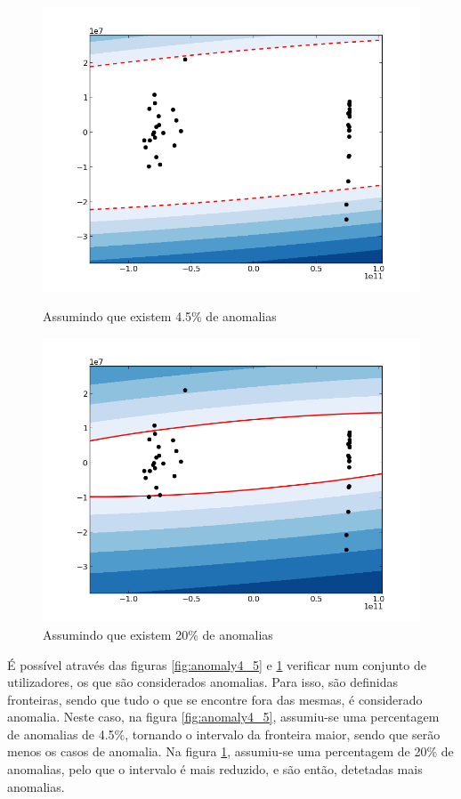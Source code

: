 \documentclass[pdftex,12pt,a4paper]{report}
\begin{document}
\begin{figure}[!htb]
  \centering
  \begin{minipage}[b]{0.4\textwidth}
    \includegraphics[width=\textwidth]{anomaly/ex17_4_5.png}
    \caption{Assumindo que existem 4.5\% de anomalias}
    \label{fig:anomaly4_5}
  \end{minipage}
  \hfill
  \begin{minipage}[b]{0.4\textwidth}
    \includegraphics[width=\textwidth]{anomaly/ex17_20.png}
    \caption{Assumindo que existem 20\% de anomalias}
    \label{fig:anomaly20}
  \end{minipage}
\end{figure}

É possível através das figuras \ref{fig:anomaly4_5} e \ref{fig:anomaly20} verificar num conjunto de utilizadores, os que são considerados anomalias. Para isso, são definidas fronteiras, sendo que tudo o que se encontre fora das mesmas, é considerado anomalia. Neste caso, na figura \ref{fig:anomaly4_5}, assumiu-se uma percentagem de anomalias de 4.5\%, tornando o intervalo da fronteira maior, sendo que serão menos os casos de anomalia. Na figura \ref{fig:anomaly20}, assumiu-se uma percentagem de 20\% de anomalias, pelo que o intervalo é mais reduzido, e são então, detetadas mais anomalias.
\end{document}
